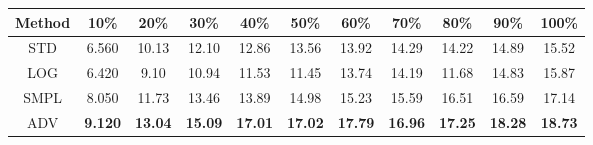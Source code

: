 \documentclass{standalone}
\begin{document}
\begin{tabular}{c|cccccccccc}
      \toprule
      Method & 10\% & 20\% & 30\% & 40\% & 50\% & 60\% & 70\% & 80\% & 90\% & 100\% \\
      \midrule
STD & 6.560 & 10.13 & 12.10 & 12.86 & 13.56 & 13.92 & 14.29 & 14.22 & 14.89 & 15.52\\
LOG & 6.420 & 9.10 & 10.94 & 11.53 & 11.45 & 13.74 & 14.19 & 11.68 & 14.83 & 15.87\\
SMPL & 8.050 & 11.73 & 13.46 & 13.89 & 14.98 & 15.23 & 15.59 & 16.51 & 16.59 & 17.14\\
ADV & \textbf{9.120} & \textbf{13.04} & \textbf{15.09} & \textbf{17.01} & \textbf{17.02} & \textbf{17.79} & \textbf{16.96} & \textbf{17.25} & \textbf{18.28} & \textbf{18.73}\\
  \bottomrule
\end{tabular}
\end{document}
